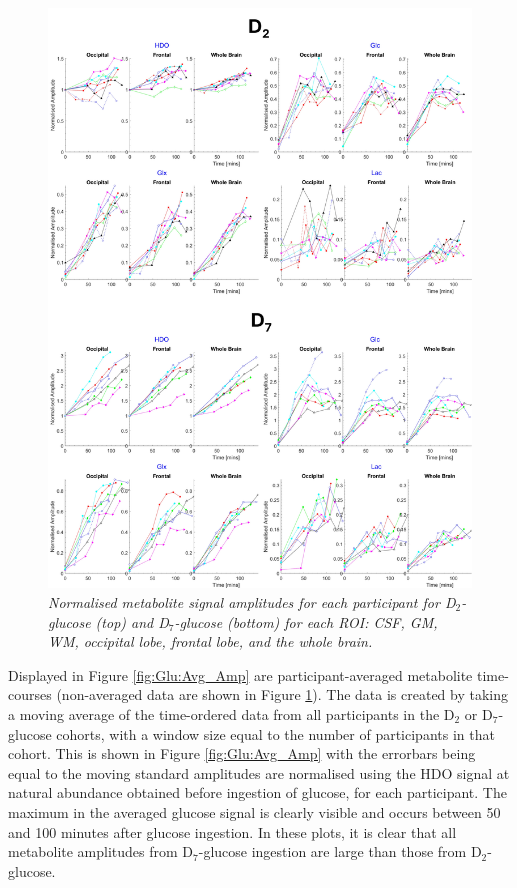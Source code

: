 \documentclass[class=article, crop=false]{standalone}
\begin{document}
\begin{figure}
    \centering
    \includegraphics[width = 1\textwidth]{Figures/Glucose/Ind_Amp.png}
    \caption{\textit{Normalised metabolite signal amplitudes for each participant for D$_2$-glucose (top) and D$_7$-glucose (bottom) for each ROI: CSF, GM, WM, occipital lobe, frontal lobe, and the whole brain.}}
    \label{fig:Glu:Ind_Amp}
\end{figure}

Displayed in Figure \ref{fig:Glu:Avg_Amp} are participant-averaged metabolite time-courses (non-averaged data are shown in Figure \ref{fig:Glu:Ind_Amp}). The data is created by taking a moving average of the time-ordered data from all participants in the D$_2$ or D$_7$-glucose cohorts, with a window size equal to the number of participants in that cohort. This is shown in Figure \ref{fig:Glu:Avg_Amp} with the errorbars being equal to the moving standard  amplitudes are normalised using the HDO signal at natural abundance obtained before ingestion of glucose, for each participant. The maximum in the averaged glucose signal is clearly visible and occurs between 50 and 100 minutes after glucose ingestion. In these plots, it is clear that all metabolite amplitudes from D$_7$-glucose ingestion are large than those from D$_2$-glucose. 
\end{document}
